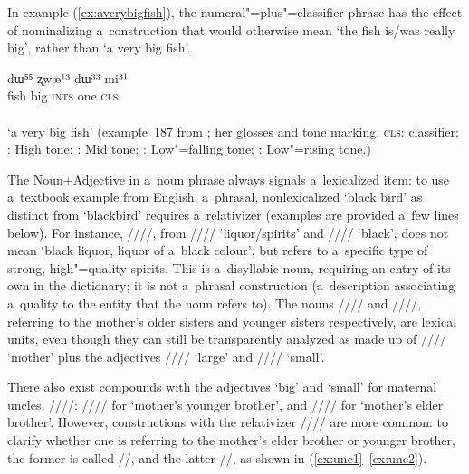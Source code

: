 In example (\ref{ex:averybigfish}), the
{numeral}"=plus"=classifier phrase has the effect of nominalizing a~construction that would otherwise
mean ‘the fish is/was really big’, rather than ‘a very big fish’.

\begin{exe}
  \ex
  \label{ex:averybigfish}
   dɯ⁵⁵ ʐwæ¹³ dɯ³³ mi³¹\\
  fish big \textsc{ints} one \textsc{cls}\\
      \\
  \glt ‘a very big fish’ (example~187 from \citealt[215]{lidz2010}; her glosses and tone marking. \textsc{cls}: classifier; : High tone; : Mid tone; : Low"=falling tone; : Low"=rising tone.)
\end{exe}

\largerpage[-2] %
The  Noun+Adjective in a~noun phrase always signals a~lexicalized item: to use a~textbook example from {English}, a~phrasal, nonlexicalized ‘black bird' as distinct from ‘blackbird' requires a~{relativizer} (examples are provided a~few lines below). For instance, ////, from ////
‘liquor/spirits’ and //// ‘black’, does not mean ‘black liquor, liquor of a~black colour’, but
refers to a~specific type of strong, high"=quality spirits. This is a~disyllabic noun, requiring an entry of its own in the dictionary; it is not a~phrasal construction (a~description associating
a~quality to the entity that the noun refers to). The nouns //// and
////, referring to the mother’s older sisters and younger sisters respectively, are
lexical units, even though they can still be transparently analyzed as made up of ////
‘mother’ plus the adjectives //// ‘large’ and //// ‘small’. 

There also exist compounds with the adjectives ‘big’ and ‘small’ for maternal uncles, ////: //// for ‘mother's younger brother’, and //// for ‘mother's elder brother’. However, constructions with the
{relativizer} \mbox{////} are more common: to clarify
whether one is referring to the mother’s elder brother or younger brother, the former is called //, and the latter //, as shown in (\ref{ex:unc1}--\ref{ex:unc2}). 

